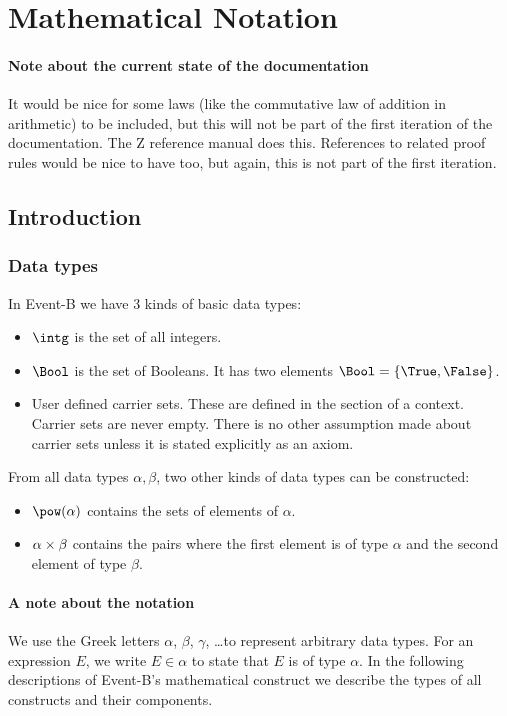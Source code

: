 \section{Mathematical Notation}
\label{mathematical_notation}

\paragraph{Note about the current state of the documentation}
It would be nice for some laws (like the commutative law of addition in arithmetic) to be included, but this will not be part of the first iteration of the documentation. The Z reference manual does this.
References to related proof rules would be nice to have too, but again, this is not part of the first iteration.

\subsection{Introduction}

\subsubsection{Data types}
\label{data_types}

In Event-B we have 3 kinds of basic data types:
\begin{itemize}
\item $\intg$ is the set of all integers.
\item {}
  $\Bool$ is the set of Booleans. 
  It has two elements $\Bool = \{\True,\False\}$.
\item User defined carrier sets. 
  These are defined in the  section of a context.
  Carrier sets are never empty.
  There is no other assumption made about carrier sets unless it is stated explicitly as
  an axiom.
\end{itemize}
From all data types $\alpha, \beta$, two other kinds of data types can be constructed:
\begin{itemize}
\item $\pow(\alpha)$ contains the sets of elements of $\alpha$.
\item $\alpha\mathbin\times\beta$ contains the pairs where the first element is of type $\alpha$ and the
  second element of type $\beta$.
\end{itemize}
\paragraph{A note about the notation}
We use the Greek letters $\alpha$, $\beta$, $\gamma$, \ldots to represent arbitrary data types.
For an expression $E$, we write $E\in\alpha$ to state that $E$ is of type $\alpha$.
In the following descriptions of Event-B's mathematical construct we describe the
  types of all constructs and their components.

